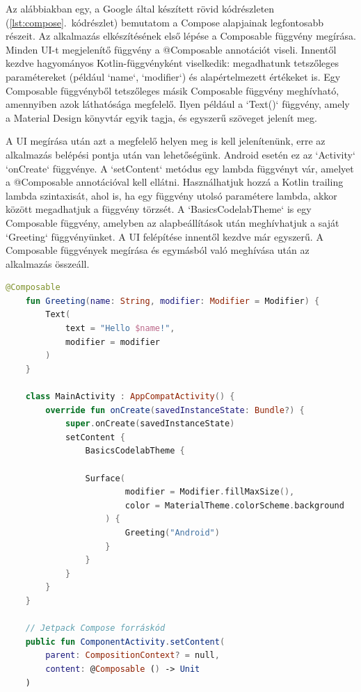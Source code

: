 Az alábbiakban egy, a Google által készített rövid kódrészleten (\ref{lst:compose}.~kódrészlet) bemutatom a Compose alapjainak legfontosabb részeit. \cite{BasicCodelab}  
Az alkalmazás elkészítésének első lépése a Composable függvény megírása.  
Minden UI-t megjelenítő függvény a @Composable annotációt viseli.  
Innentől kezdve hagyományos Kotlin-függvényként viselkedik: megadhatunk tetszőleges paramétereket (például `name`, `modifier`) és alapértelmezett értékeket is.  
Egy Composable függvényből tetszőleges másik Composable függvény meghívható, amennyiben azok láthatósága megfelelő.  
Ilyen például a `Text()` függvény, amely a Material Design könyvtár egyik tagja, és egyszerű szöveget jelenít meg.

A UI megírása után azt a megfelelő helyen meg is kell jelenítenünk, erre az alkalmazás belépési pontja után van lehetőségünk.  
Android esetén ez az `Activity` `onCreate` függvénye.  
A `setContent` metódus egy lambda függvényt vár, amelyet a @Composable annotációval kell ellátni.  
Használhatjuk hozzá a Kotlin trailing lambda szintaxisát, ahol is, ha egy függvény utolsó paramétere lambda, akkor {} között megadhatjuk a függvény törzsét.  
A `BasicsCodelabTheme` is egy Composable függvény, amelyben az alapbeállítások után meghívhatjuk a saját `Greeting` függvényünket.  
A UI felépítése innentől kezdve már egyszerű. A Composable függvények megírása és egymásból való meghívása után az alkalmazás összeáll.

\begin{lstlisting}[caption={Példa a Compose használatára.}, label={lst:compose}, language=Kotlin]
    @Composable
    fun Greeting(name: String, modifier: Modifier = Modifier) {
        Text(
            text = "Hello $name!",
            modifier = modifier
        )
    }

    class MainActivity : AppCompatActivity() {
        override fun onCreate(savedInstanceState: Bundle?) {
            super.onCreate(savedInstanceState)
            setContent {
                BasicsCodelabTheme {

                Surface(
                        modifier = Modifier.fillMaxSize(),
                        color = MaterialTheme.colorScheme.background
                    ) {
                        Greeting("Android")
                    }
                }
            }
        }
    }

    // Jetpack Compose forráskód
    public fun ComponentActivity.setContent(
        parent: CompositionContext? = null,
        content: @Composable () -> Unit
    )
\end{lstlisting}

